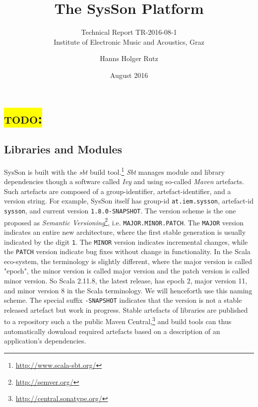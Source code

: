 \documentclass[11pt,a4paper]{article}
\title{The SysSon Platform}
\subtitle{Technical Report TR-2016-08-1\\Institute of Electronic Music and Acoustics, Graz}
\author{Hanns Holger Rutz}
\date{August 2016}
\newcommand{\todo}[1]{\colorbox{yellow}{\textsc{todo}: #1}}
\newcommand{\software}[1]{\textit{#1}}
\newcommand{\sysson}[0]{SysSon}
\begin{document}
\maketitle
{}
\thispagestyle{empty}
\newpage
\section{\todo{}}

\subsection{Libraries and Modules}

\sysson{} is built with the \software{sbt} build tool.\footnote{\url{http://www.scala-sbt.org/}} \software{Sbt} manages module and library dependencies though a software called \software{Ivy} and using so-called \software{Maven} artefacts. Such artefacts are composed of a group-identifier, artefact-identifier, and a version string. For example, \sysson{} itself has group-id \verb!at.iem.sysson!, artefact-id \verb!sysson!, and current version \verb!1.8.0-SNAPSHOT!. The version scheme is the one proposed as \emph{Semantic Versioning}\footnote{\url{http://semver.org/}}, i.e. \verb!MAJOR.MINOR.PATCH!. The \verb!MAJOR! version indicates an entire new architecture, where the first stable generation is usually indicated by the digit \verb!1!. The \verb!MINOR! version indicates incremental changes, while the \verb!PATCH! version indicate bug fixes without change in functionality. In the Scala eco-system, the terminology is slightly different, where the major version is called "epoch", the minor version is called major version and the patch version is called minor version. So Scala 2.11.8, the latest release, has epoch 2, major version 11, and minor version 8 in the Scala terminology. We will henceforth use this naming scheme. The special suffix \verb!-SNAPSHOT! indicates that the version is not a stable released artefact but work in progress. Stable artefacts of libraries are published to a repository such a the public Maven Central,\footnote{\url{http://central.sonatype.org/}} and build tools can thus automatically download required artefacts based on a description of an application's dependencies.
\end{document}
